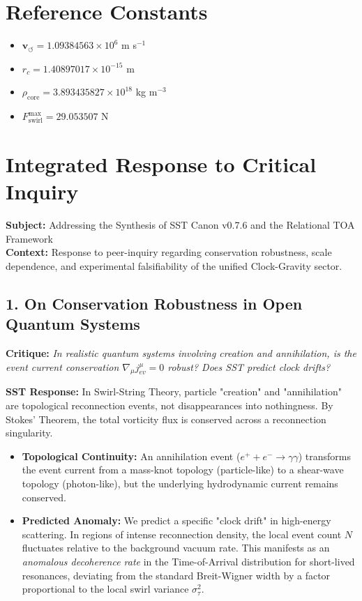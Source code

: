 \documentclass[10pt]{article}
\newcommand{\rhocore}{\rho_{\text{core}}}
\begin{document}
    \section{Reference Constants}
    \begin{itemize}
        \item $\mathbf{v}_{\circlearrowleft} = 1.09384563 \times 10^6$ m s$^{-1}$
        \item $r_c = 1.40897017 \times 10^{-15}$ m
        \item $\rhocore = 3.893435827 \times 10^{18}$ kg m$^{-3}$
        \item $F_{\text{swirl}}^{\max} = 29.053507$ N
    \end{itemize}



\section{Integrated Response to Critical Inquiry}

\noindent \textbf{Subject:} Addressing the Synthesis of SST Canon v0.7.6 and the Relational TOA Framework \\
\textbf{Context:} Response to peer-inquiry regarding conservation robustness, scale dependence, and experimental falsifiability of the unified Clock-Gravity sector.

\subsection*{1. On Conservation Robustness in Open Quantum Systems}
\noindent \textbf{Critique:} \textit{In realistic quantum systems involving creation and annihilation, is the event current conservation $\nabla_\mu j^\mu_{ev} = 0$ robust? Does SST predict clock drifts?}

\noindent \textbf{SST Response:}
In Swirl-String Theory, particle "creation" and "annihilation" are topological reconnection events, not disappearances into nothingness. By Stokes' Theorem, the total vorticity flux is conserved across a reconnection singularity.
\begin{itemize}
    \item \textbf{Topological Continuity:} An annihilation event ($e^+ + e^- \to \gamma\gamma$) transforms the event current from a mass-knot topology (particle-like) to a shear-wave topology (photon-like), but the underlying hydrodynamic current remains conserved.
    \item \textbf{Predicted Anomaly:} We predict a specific "clock drift" in high-energy scattering. In regions of intense reconnection density, the local event count $N$ fluctuates relative to the background vacuum rate. This manifests as an \textit{anomalous decoherence rate} in the Time-of-Arrival distribution for short-lived resonances, deviating from the standard Breit-Wigner width by a factor proportional to the local swirl variance $\sigma_\tau^2$.
\end{itemize}
\end{document}
